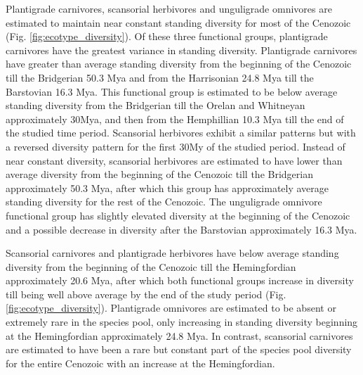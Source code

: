 \documentclass[12pt,letterpaper]{article}
\begin{document}
Plantigrade carnivores, scansorial herbivores and unguligrade omnivores are estimated to maintain near constant standing diversity for most of the Cenozoic (Fig. \ref{fig:ecotype_diversity}). Of these three functional groups, plantigrade carnivores have the greatest variance in standing diversity. Plantigrade carnivores have greater than average standing diversity from the beginning of the Cenozoic till the Bridgerian 50.3 Mya and from the Harrisonian 24.8 Mya till the Barstovian 16.3 Mya. This functional group is estimated to be below average standing diversity from the Bridgerian till the Orelan and Whitneyan approximately 30Mya, and then from the Hemphillian 10.3 Mya till the end of the studied time period. Scansorial herbivores exhibit a similar patterns but with a reversed diversity pattern for the first 30My of the studied period. Instead of near constant diversity, scansorial herbivores are estimated to have lower than average diversity from the beginning of the Cenozoic till the Bridgerian approximately 50.3 Mya, after which this group has approximately average standing diversity for the rest of the Cenozoic. The unguligrade omnivore functional group has slightly elevated diversity at the beginning of the Cenozoic and a possible decrease in diversity after the Barstovian approximately 16.3 Mya.

Scansorial carnivores and plantigrade herbivores have below average standing diversity from the beginning of the Cenozoic till the Hemingfordian approximately 20.6 Mya, after which both functional groups increase in diversity till being well above average by the end of the study period (Fig. \ref{fig:ecotype_diversity}). Plantigrade omnivores are estimated to be absent or extremely rare in the species pool, only increasing in standing diversity beginning at the Hemingfordian approximately 24.8 Mya. In contrast, scansorial carnivores are estimated to have been a rare but constant part of the species pool diversity for the entire Cenozoic with an increase at the Hemingfordian.
\end{document}
